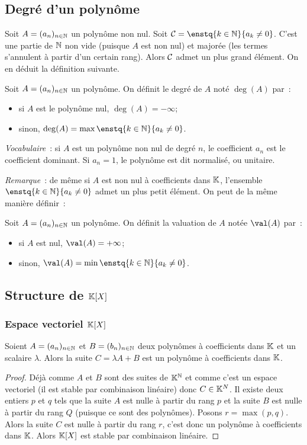 \subsection{Degré d'un polynôme}

Soit $A=(a_n)_{n \in \mathbb{N}}$ un polynôme non nul. Soit $\courbe = \enstq{k \in \N}{a_k \neq 0}$. C'est une partie de $\mathbb{N}$ non vide (puisque $A$ est non nul) et majorée (les termes s'annulent à partir d'un certain rang). Alors $\mathcal{C}$ admet un plus grand élément. On en déduit la définition suivante.

\begin{defdef}
  Soit $A=(a_n)_{n \in \mathbb{N}}$ un polynôme. On définit le degré de $A$ noté $\deg(A)$ par~:
  \begin{itemize}
  \item si $A$ est le polynôme nul, $\deg(A)=-\infty$;
  \item sinon, $\deg(A)=\max \enstq{k \in \N}{a_k \neq 0}$.
  \end{itemize}
\end{defdef}

\emph{Vocabulaire}~: si $A$ est un polynôme non nul de degré $n$, le coefficient $a_n$ est le coefficient dominant. Si $a_n=1$, le polynôme est dit normalisé, ou unitaire.

\emph{Remarque}~: de même si $A$ est non nul à coefficients dans $\mathbb{K}$, l'ensemble $\enstq{k \in \N}{a_k \neq 0}$ admet un plus petit élément. On peut de la même manière définir~:

Soit $A=(a_n)_{n \in \mathbb{N}}$ un polynôme. On définit la valuation de $A$ notée $\val(A)$ par~:
\begin{itemize}
\item si $A$ est nul, $\val(A)=+\infty$;
\item sinon, $\val(A)=\min \enstq{k \in \N}{a_k \neq 0}$.
\end{itemize}


\subsection{Structure de $\mathbb{K}[X]$}

\subsubsection{Espace vectoriel $\mathbb{K}[X]$}

\begin{lemme}
  Soient $A=(a_n)_{n \in \mathbb{N}}$ et $B=(b_n)_{n \in \mathbb{N}}$ deux polynômes à coefficients dans $\mathbb{K}$ et un scalaire $\lambda$. Alors la suite $C=\lambda A+B$ est un polynôme à coefficients dans $\mathbb{K}$.
\end{lemme}
\begin{proof}
  Déjà comme $A$ et $B$ sont des suites de $\mathbb{K}^{\mathbb{N}}$ et comme c'est un espace vectoriel (il est stable par combinaison linéaire) donc $C \in \mathbb{K}^N$. Il existe deux entiers $p$ et $q$ tels que la suite $A$ est nulle à partir du rang $p$ et la suite $B$ est nulle à partir du rang $Q$ (puisque ce sont des polynômes). Posons $r=\max(p,q)$. Alors la suite $C$ est nulle à partir du rang $r$, c'est donc un polynôme à coefficients dans $\mathbb{K}$. Alors $\mathbb{K}[X]$ est stable par combinaison linéaire. 
\end{proof}

